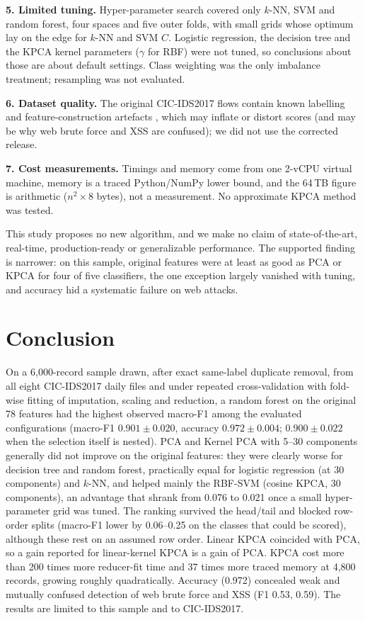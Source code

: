 \documentclass{ieeeaccess}
\begin{document}
\textbf{5. Limited tuning.} Hyper-parameter search covered only $k$-NN, SVM and random forest, four spaces and five outer folds, with small grids whose optimum lay on the edge for $k$-NN and SVM $C$. Logistic regression, the decision tree and the KPCA kernel parameters ($\gamma$ for RBF) were not tuned, so conclusions about those are about default settings. Class weighting was the only imbalance treatment; resampling was not evaluated.

\textbf{6. Dataset quality.} The original CIC-IDS2017 flows contain known labelling and feature-construction artefacts \cite{engelen2021}, which may inflate or distort scores (and may be why web brute force and XSS are confused); we did not use the corrected release.

\textbf{7. Cost measurements.} Timings and memory come from one 2-vCPU virtual machine, memory is a traced Python/NumPy lower bound, and the 64\,TB figure is arithmetic ($n^2\times8$ bytes), not a measurement. No approximate KPCA method was tested.

This study proposes no new algorithm, and we make no claim of state-of-the-art, real-time, production-ready or generalizable performance. The supported finding is narrower: on this sample, original features were at least as good as PCA or KPCA for four of five classifiers, the one exception largely vanished with tuning, and accuracy hid a systematic failure on web attacks.

\section{Conclusion}
On a 6{,}000-record sample drawn, after exact same-label duplicate removal, from all eight CIC-IDS2017 daily files and under repeated cross-validation with fold-wise fitting of imputation, scaling and reduction, a random forest on the original 78 features had the highest observed macro-F1 among the evaluated configurations (macro-F1 $0.901\pm0.020$, accuracy $0.972\pm0.004$; $0.900\pm0.022$ when the selection itself is nested). PCA and Kernel PCA with 5--30 components generally did not improve on the original features: they were clearly worse for decision tree and random forest, practically equal for logistic regression (at 30 components) and $k$-NN, and helped mainly the RBF-SVM (cosine KPCA, 30 components), an advantage that shrank from 0.076 to 0.021 once a small hyper-parameter grid was tuned. The ranking survived the head/tail and blocked row-order splits (macro-F1 lower by 0.06--0.25 on the classes that could be scored), although these rest on an assumed row order. Linear KPCA coincided with PCA, so a gain reported for linear-kernel KPCA is a gain of PCA. KPCA cost more than 200 times more reducer-fit time and 37 times more traced memory at 4{,}800 records, growing roughly quadratically. Accuracy (0.972) concealed weak and mutually confused detection of web brute force and XSS (F1 0.53, 0.59). The results are limited to this sample and to CIC-IDS2017.
\end{document}
